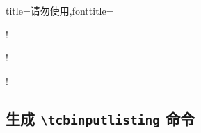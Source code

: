\begin{dispListing*}{title={请勿使用},fonttitle=\bfseries}

\begin{mybox}[colframe=red]
\good
\end{mybox}

\begin{mybox}[colframe=red]\good\end{mybox}

\begin{mybox}
\bad!
\end{mybox}

\begin{mybox} \bad!\end{mybox}

\begin{mybox}\bad!\end{mybox}

\begin{mybox}
[\bad!]
\end{mybox}

\begin{mybox} [\bad!]\end{mybox}

\begin{mybox}[\bad!]\end{mybox}
\end{dispListing*}


\clearpage
\subsection{生成 \texttt{\textbackslash tcbinputlisting} 命令}\label{subsec:listings_inputlisting}
\enlargethispage*{1cm}


